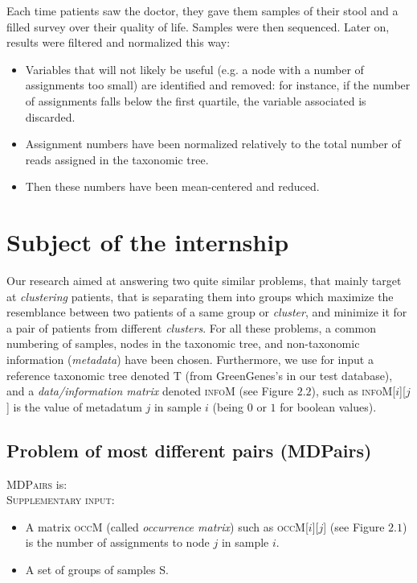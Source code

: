\documentclass{report}
\begin{document}
Each time patients saw the doctor, they gave them samples of their stool and a filled survey over their quality of life. Samples were then sequenced. Later on, results were filtered and normalized this way:

\begin{itemize}
\item Variables that will not likely be useful (e.g. a node with a number of assignments too small) are identified and removed: for instance, if the number of assignments falls below the first quartile, the variable associated is discarded.
\item Assignment numbers have been normalized relatively to the total number of reads assigned in the taxonomic tree.
\item Then these numbers have been mean-centered and reduced.
\end{itemize}

\newpage

\chapter{Subject of the internship}

Our research aimed at answering two quite similar problems, that mainly target at \emph{clustering} patients, that is separating them into groups which maximize the resemblance between two patients of a same group or \emph{cluster}, and minimize it for a pair of patients from different \emph{clusters}. For all these problems, a common numbering of samples, nodes in the taxonomic tree, and non-taxonomic information (\emph{metadata}) have been chosen. Furthermore, we use for input a reference taxonomic tree denoted \textsc{T} (from GreenGenes's in our test database), and a \emph{data/information matrix} denoted \textsc{infoM} (see Figure $2.2$), such as \textsc{infoM}[$i$][$j$] is the value of metadatum $j$ in sample $i$ (being $0$ or $1$ for boolean values). 

\section{Problem of most different pairs (MDPairs)}
\textsc{MDPairs} is:\\

\textsc{Supplementary input:} 
                \begin{itemize}
                \item A matrix \textsc{occM} (called \emph{occurrence matrix}) such as \textsc{occM}[$i$][$j$] (see Figure $2.1$) is the number of assignments to node $j$ in sample $i$.
                \item A set of groups of samples \textsc{S}.
                \end{itemize}
\end{document}
